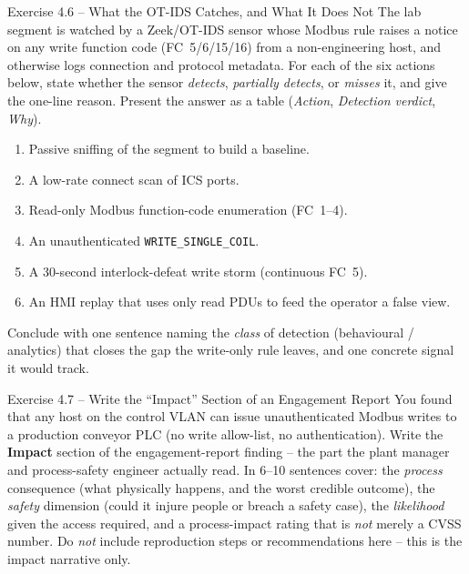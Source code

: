 \documentclass[11pt,a4paper]{article}
\begin{document}
\begin{taskbox}{Exercise 4.6 -- What the OT-IDS Catches, and What It Does Not}
The lab segment is watched by a Zeek/OT-IDS sensor whose Modbus rule raises a notice on any
write function code (FC~5/6/15/16) from a non-engineering host, and otherwise logs connection and
protocol metadata. For each of the six actions below, state whether the sensor \emph{detects},
\emph{partially detects}, or \emph{misses} it, and give the one-line reason. Present the answer as a
table (\emph{Action}, \emph{Detection verdict}, \emph{Why}).
\begin{enumerate}\setlength{\itemsep}{0pt}
  \item Passive sniffing of the segment to build a baseline.
  \item A low-rate connect scan of ICS ports.
  \item Read-only Modbus function-code enumeration (FC~1--4).
  \item An unauthenticated \texttt{WRITE\_SINGLE\_COIL}.
  \item A 30-second interlock-defeat write storm (continuous FC~5).
  \item An HMI replay that uses only read PDUs to feed the operator a false view.
\end{enumerate}
Conclude with one sentence naming the \emph{class} of detection (behavioural / analytics) that
closes the gap the write-only rule leaves, and one concrete signal it would track.
\end{taskbox}

\begin{taskbox}{Exercise 4.7 -- Write the ``Impact'' Section of an Engagement Report}
You found that any host on the control VLAN can issue unauthenticated Modbus writes to a
production conveyor PLC (no write allow-list, no authentication). Write the \textbf{Impact}
section of the engagement-report finding -- the part the plant manager and process-safety engineer
actually read. In 6--10 sentences cover: the \emph{process} consequence (what physically happens,
and the worst credible outcome), the \emph{safety} dimension (could it injure people or breach a
safety case), the \emph{likelihood} given the access required, and a process-impact rating that is
\emph{not} merely a CVSS number. Do \emph{not} include reproduction steps or recommendations here --
this is the impact narrative only.
\end{taskbox}
\end{document}
